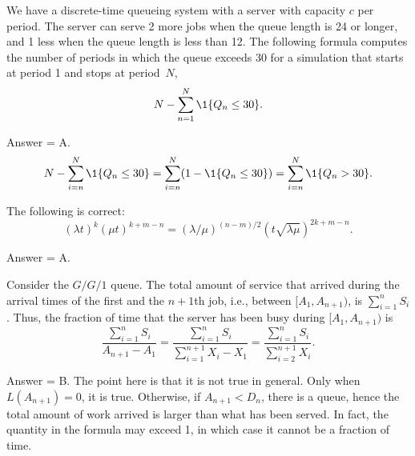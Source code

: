 \begin{exercise}[201804]
We have a discrete-time queueing system with a server with capacity $c$ per period. The server can serve 2 more jobs
when the queue length is 24 or longer, and  1 less when the queue length is less than 12.  
The following formula computes the number of periods in which the queue exceeds 30 for a simulation that starts at period 1 and stops at period~$N$, 
\begin{equation*}
N-  \sum_{n=1}^N \1{Q_n \leq 30}.
\end{equation*}
\begin{solution}
Answer = A. 
\begin{equation*}
N-  \sum_{i=n}^N \1{Q_n \leq 30} = 
\sum_{i=n}^N (1-\1{Q_n \leq 30}) = 
\sum_{i=n}^N \1{Q_n > 30}.
\end{equation*}
\end{solution}
\end{exercise}

\begin{exercise}[201804]
The following is correct: 
\begin{equation*}
  (\lambda t)^k (\mu t) ^{k + m - n}  
= (\lambda/\mu)^{(n-m)/2} (t\sqrt{\lambda \mu})^{2k+m-n}.
\end{equation*}
\begin{solution}
Answer = A.
\end{solution}
\end{exercise}

\begin{exercise}[201804] 
Consider the $G/G/1$ queue.  The total amount of service that arrived during the arrival times of the first and the $n+1$th job, i.e., between $[A_1, A_{n+1})$, is $\sum_{i=1}^n S_i$.
Thus,  the     fraction of time that the server has been busy during $[A_1, A_{n+1})$    is
        \begin{equation*}
\frac{\sum_{i=1}^n S_i}{A_{n+1}-A_1} 
=          \frac{\sum_{i=1}^n S_i}{\sum_{i=1}^{n+1}X_i -X_1} 
=          \frac{\sum_{i=1}^n S_i}{\sum_{i=2}^{n+1}X_i}.
        \end{equation*}
\begin{solution}
Answer = B. The point here is that it is not true in general. Only when $L(A_{n+1})=0$, it is true. Otherwise, if $A_{n+1}< D_n$, there is a queue, hence the total amount of work arrived is larger than what has been served. In fact, the quantity in the formula may exceed 1, in which case it cannot be a fraction of time.
\end{solution}
\end{exercise}

